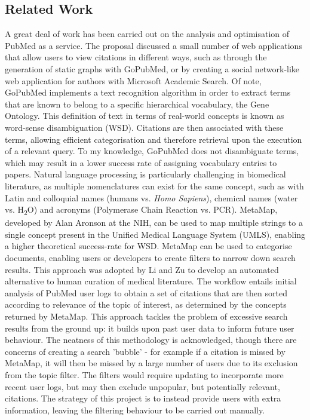 \documentclass[Report.tex]{subfiles}
\begin{document}
\subsection{Related Work}
A great deal of work has been carried out on the analysis and optimisation of PubMed as a service. The proposal discussed a small number of web applications that allow users to view citations in different ways, such as through the generation of static graphs with GoPubMed\cite{gopubmed}, or by creating a social network-like web application for authors with Microsoft Academic Search\cite{mas}. Of note, GoPubMed implements a text recognition algorithm in order to extract terms that are known to belong to a specific hierarchical vocabulary, the Gene Ontology. This definition of text in terms of real-world concepts is known as word-sense disambiguation (WSD). Citations are then associated with these terms, allowing efficient categorisation and therefore retrieval upon the execution of a relevant query. To my knowledge, GoPubMed does not disambiguate terms, which may result in a lower success rate of assigning vocabulary entries to papers. Natural language processing is particularly challenging in biomedical literature, as multiple nomenclatures can exist for the same concept, such as with Latin and colloquial names (humans vs. \emph{Homo Sapiens}), chemical names (water vs. H{\textsubscript{2}}O) and acronyms (Polymerase Chain Reaction vs. PCR). MetaMap, developed by Alan Aronson at the NIH, can be used to map multiple strings to a single concept present in the Unified Medical Language System (UMLS), enabling a higher theoretical success-rate for WSD. MetaMap can be used to categorise documents, enabling users or developers to create filters to narrow down search results. This approach was adopted by Li and Zu\cite{lizu} to develop an automated alternative to human curation of medical literature. The workflow entails initial analysis of PubMed user logs to obtain a set of citations that are then sorted according to relevance of the topic of interest, as determined by the concepts returned by MetaMap. This approach tackles the problem of excessive search results from the ground up: it builds upon past user data to inform future user behaviour. The neatness of this methodology is acknowledged, though there are concerns of creating a search 'bubble' - for example if a citation is missed by MetaMap, it will then be missed by a large number of users due to its exclusion from the topic filter. The filters would require updating to incorporate more recent user logs, but may then exclude unpopular, but potentially relevant, citations. The strategy of this project is to instead provide users with extra information, leaving the filtering behaviour to be carried out manually. 
\end{document}

